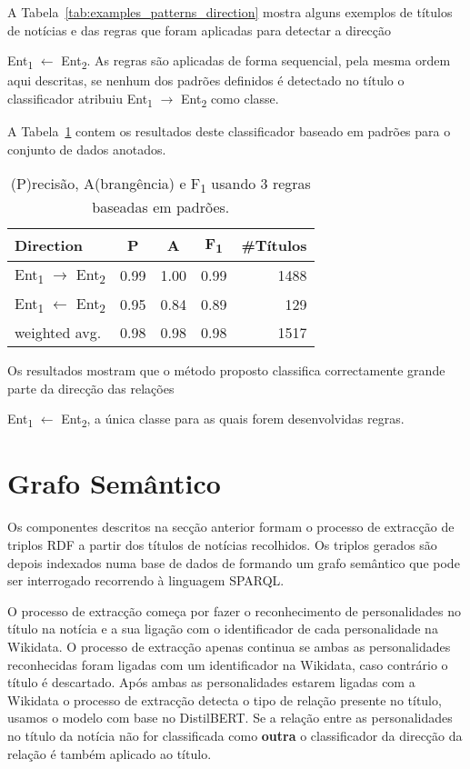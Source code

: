 \documentclass[a4paper, twocolumn, 11pt, twoside]{article}
\begin{document}
A Tabela~\ref{tab:examples_patterns_direction} mostra alguns exemplos de títulos de notícias e das regras que foram aplicadas para detectar a direcção {Ent\textsubscript{1} $\leftarrow$ Ent\textsubscript{2}. As regras são aplicadas de forma sequencial, pela mesma ordem aqui descritas, se nenhum dos padrões definidos é detectado no título o classificador atribuiu {Ent\textsubscript{1} $\rightarrow$ Ent\textsubscript{2}} como classe.

A Tabela~\ref{tab:direction_clf_results} contem os resultados deste classificador baseado em padrões para o conjunto de dados anotados.

\begin{table}[!h]
    \begin{center}
    \begin{tabular}{l cccr}
        {\bf Direction} & {\bf P} & {\bf A} & {\bf F\textsubscript{1}} & {\bf \#Títulos} \\
        \hline
        \small{Ent\textsubscript{1} $\rightarrow$ Ent\textsubscript{2}} & 0.99  &  1.00  &  0.99  & 1488 \\
		\small{Ent\textsubscript{1} $\leftarrow$ Ent\textsubscript{2}}  & 0.95  &  0.84  &  0.89  & 129  \\
		\hline
	    weighted avg.     &      0.98       & 0.98       & 0.98		&   1517 \\
    \end{tabular}
	\caption{(P)recisão, A(brangência) e F\textsubscript{1} usando 3 regras baseadas em padrões.}
	\label{tab:direction_clf_results}
	\end{center}
\end{table}

Os resultados mostram que o método proposto classifica correctamente grande parte da direcção das relações {Ent\textsubscript{1} $\leftarrow$ Ent\textsubscript{2}, a única classe para as quais forem desenvolvidas regras.

\section{Grafo Semântico}
\label{sec:pipeline}

Os componentes descritos na secção anterior formam o processo de extracção de triplos RDF a partir dos títulos de notícias recolhidos. Os triplos gerados são depois indexados numa base de dados de formando um grafo semântico que pode ser interrogado recorrendo à linguagem SPARQL.

O processo de extracção começa por fazer o reconhecimento de personalidades no título na notícia e a sua ligação com o identificador de cada personalidade na Wikidata. O processo de extracção apenas continua se ambas as personalidades reconhecidas foram ligadas com um identificador na Wikidata, caso contrário o título é descartado.  Após ambas as personalidades estarem ligadas com a Wikidata o processo de extracção detecta o tipo de relação presente no título, usamos o modelo com base no DistilBERT. Se a relação entre as personalidades no título da notícia não for classificada como \textbf{outra} o classificador da direcção da relação é também aplicado ao título. 

}}
\end{document}
